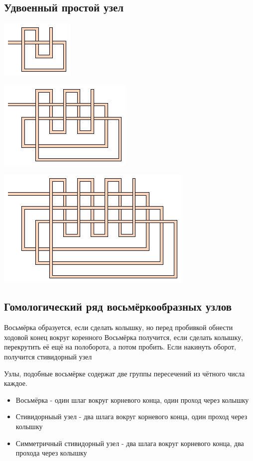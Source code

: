 \subsection{Удвоенный простой узел}
\includegraphics[scale=2]{images/double-simple-1-1.eps}

\includegraphics[scale=2]{images/double-simple-2-2.eps}

\includegraphics[scale=2]{images/double-simple-3-3.eps}

\subsection{Гомологический ряд восьмёркообразных узлов}

Восьмёрка образуется, если сделать колышку, но перед пробивкой обнести ходовой конец вокруг коренного
Восьмёрка получится, если сделать колышку, перекрутить её ещё на полоборота, а потом пробить.
Если накинуть оборот, получится стивидорный узел

Узлы, подобные восьмёрке содержат две группы пересечений из чётного числа каждое.

\begin{itemize}
\item Восьмёрка - один шлаг вокруг корневого конца, один проход через колышку

\item Стивидорныый узел - два шлага вокруг корневого конца, один проход через колышку

\item Симметричный стивидорный узел - два шлага вокруг корневого конца, два прохода через колышку
\end{itemize}

